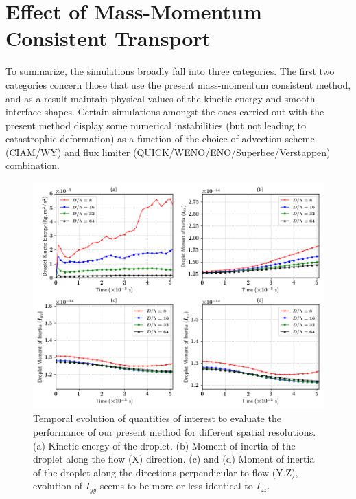 \section{Effect of Mass-Momentum Consistent Transport}

To summarize, the simulations broadly fall into three categories. 
The first two categories concern those that use the present 
mass-momentum consistent method, and as a result maintain 
physical values of the kinetic energy and smooth interface shapes. 
Certain simulations amongst the ones carried out with the present 
method display some numerical instabilities (but not leading 
to catastrophic deformation) as a function of the choice of 
advection scheme (CIAM/WY) and 
flux limiter (QUICK/WENO/ENO/Superbee/Verstappen) combination. 

\begin{figure}
\begin{center}
\includegraphics[width = 1.5\textwidth]{plots/raindrop/multiplot_raindrop.png}
\end{center}
\vspace*{-0.5cm}
\caption{Temporal evolution of quantities of interest to evaluate the 
performance of our present method for different spatial resolutions. 
(a) Kinetic energy of the droplet. 
(b) Moment of inertia of the droplet along the flow (X) direction. 
(c) and (d) Moment of inertia of the droplet along the directions 
perpendicular to flow (Y,Z), evolution of $I_{yy}$ 
seems to be more or less identical to $I_{zz}$.}
\label{multi}
\end{figure}

